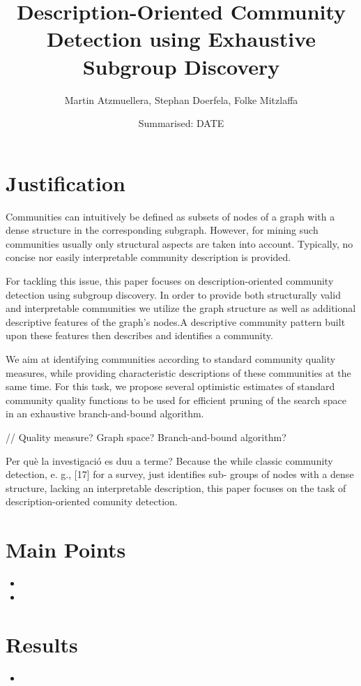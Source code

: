 \documentclass[a4paper]{article}
\title{Description-Oriented Community Detection using Exhaustive Subgroup Discovery}
\date{Summarised: DATE}
\author{Martin Atzmuellera, Stephan Doerfela, Folke Mitzlaffa}
\begin{document}
\maketitle
\section{Justification}
Communities can intuitively be defined as subsets of nodes of a graph with a dense structure in the corresponding subgraph. However, for mining such communities usually only structural aspects are taken into account. Typically, no concise nor easily interpretable community description is provided. 

For tackling this issue, this paper focuses on description-oriented community detection using subgroup discovery. In order to provide both structurally valid and interpretable communities we utilize the graph structure as well as additional descriptive features of the graph’s nodes.A descriptive community pattern built upon these features then describes and identifies a community.

We aim at identifying communities according to standard community quality measures, while providing characteristic descriptions of these communities at the same time. For this task, we propose several optimistic estimates of standard community quality functions to be used for efficient pruning of the search space in an exhaustive branch-and-bound algorithm.

//
Quality measure?
Graph space?
Branch-and-bound algorithm?

Per què la investigació es duu a terme?
Because the while classic community detection, e. g., [17] for a survey, just identifies sub- groups of nodes with a dense structure, lacking an interpretable description, this paper focuses on the task of description-oriented comunity detection.

\section{Main Points}
\begin{itemize}
  \item 
  \item 
\end{itemize}

\section{Results}
\begin{itemize}
  \item
\end{itemize}
\end{document}
